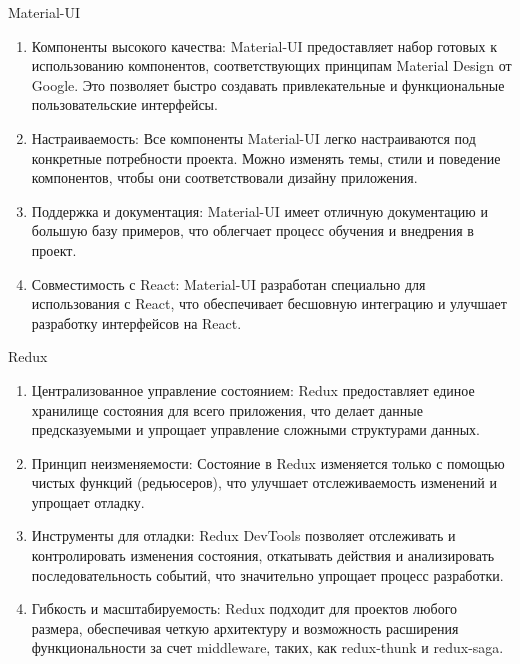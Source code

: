 \documentclass[a4paper,12pt]{article}
\begin{document}
    Material-UI
    \begin{enumerate}
        \item Компоненты высокого качества: Material-UI предоставляет набор готовых к использованию компонентов, соответствующих принципам Material Design от Google.
        Это позволяет быстро создавать привлекательные и функциональные пользовательские интерфейсы.

        \item Настраиваемость: Все компоненты Material-UI легко настраиваются под конкретные потребности проекта.
        Можно изменять темы, стили и поведение компонентов, чтобы они соответствовали дизайну приложения.

        \item Поддержка и документация: Material-UI имеет отличную документацию и большую базу примеров, что облегчает процесс обучения и внедрения в проект.

        \item Совместимость с React: Material-UI разработан специально для использования с React, что обеспечивает бесшовную интеграцию и улучшает разработку интерфейсов на React.

    \end{enumerate}

    Redux
    \begin{enumerate}
        \item Централизованное управление состоянием: Redux предоставляет единое хранилище состояния для всего приложения, что делает данные предсказуемыми и упрощает управление сложными структурами данных.
        \item Принцип неизменяемости: Состояние в Redux изменяется только с помощью чистых функций (редьюсеров), что улучшает отслеживаемость изменений и упрощает отладку.
        \item Инструменты для отладки: Redux DevTools позволяет отслеживать и контролировать изменения состояния, откатывать действия и анализировать последовательность событий, что значительно упрощает процесс разработки.
        \item Гибкость и масштабируемость: Redux подходит для проектов любого размера, обеспечивая четкую архитектуру и возможность расширения функциональности за счет middleware, таких, как redux-thunk и redux-saga.
    \end{enumerate}
\end{document}
